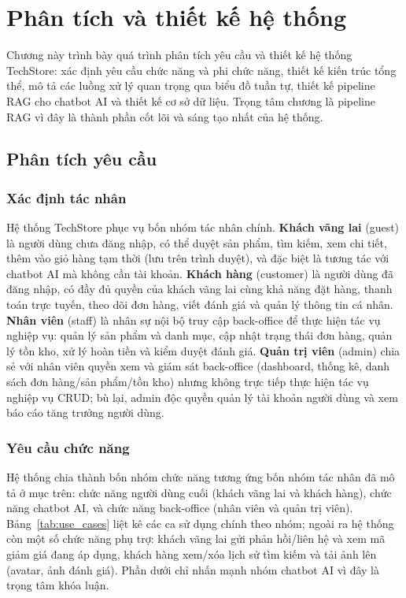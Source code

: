 \chapter{Phân tích và thiết kế hệ thống}
\label{chap:c3_design}

Chương này trình bày quá trình phân tích yêu cầu và thiết kế hệ thống TechStore: xác định yêu cầu chức năng và phi chức năng, thiết kế kiến trúc tổng thể, mô tả các luồng xử lý quan trọng qua biểu đồ tuần tự, thiết kế pipeline RAG cho chatbot AI và thiết kế cơ sở dữ liệu. Trọng tâm chương là pipeline RAG vì đây là thành phần cốt lõi và sáng tạo nhất của hệ thống.

\section{Phân tích yêu cầu}
\label{sec:c3_requirements}

\subsection{Xác định tác nhân}

Hệ thống TechStore phục vụ bốn nhóm tác nhân chính. \textbf{Khách vãng lai} (guest) là người dùng chưa đăng nhập, có thể duyệt sản phẩm, tìm kiếm, xem chi tiết, thêm vào giỏ hàng tạm thời (lưu trên trình duyệt), và đặc biệt là tương tác với chatbot AI mà không cần tài khoản. \textbf{Khách hàng} (customer) là người dùng đã đăng nhập, có đầy đủ quyền của khách vãng lai cùng khả năng đặt hàng, thanh toán trực tuyến, theo dõi đơn hàng, viết đánh giá và quản lý thông tin cá nhân. \textbf{Nhân viên} (staff) là nhân sự nội bộ truy cập back-office để thực hiện tác vụ nghiệp vụ: quản lý sản phẩm và danh mục, cập nhật trạng thái đơn hàng, quản lý tồn kho, xử lý hoàn tiền và kiểm duyệt đánh giá. \textbf{Quản trị viên} (admin) chia sẻ với nhân viên quyền xem và giám sát back-office (dashboard, thống kê, danh sách đơn hàng\slash sản phẩm\slash tồn kho) nhưng không trực tiếp thực hiện tác vụ nghiệp vụ CRUD; bù lại, admin độc quyền quản lý tài khoản người dùng và xem báo cáo tăng trưởng người dùng.

\subsection{Yêu cầu chức năng}

Hệ thống chia thành bốn nhóm chức năng tương ứng bốn nhóm tác nhân đã mô tả ở mục trên: chức năng người dùng cuối (khách vãng lai và khách hàng), chức năng chatbot AI, và chức năng back-office (nhân viên và quản trị viên). Bảng~\ref{tab:use_cases} liệt kê các ca sử dụng chính theo nhóm; ngoài ra hệ thống còn một số chức năng phụ trợ: khách vãng lai gửi phản hồi\slash liên hệ và xem mã giảm giá đang áp dụng, khách hàng xem\slash xóa lịch sử tìm kiếm và tải ảnh lên (avatar, ảnh đánh giá). Phần dưới chỉ nhấn mạnh nhóm chatbot AI vì đây là trọng tâm khóa luận.

